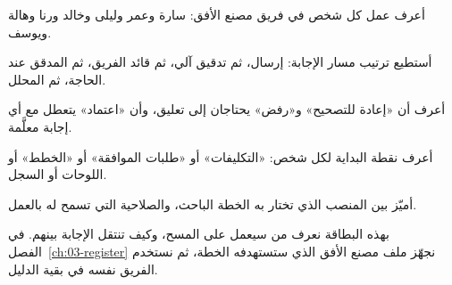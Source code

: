 \begin{rcchecklist}
\begin{checklist}
\item أعرف عمل كل شخص في فريق مصنع الأفق: سارة وعمر وليلى وخالد ورنا وهالة ويوسف.
\item أستطيع ترتيب مسار الإجابة: إرسال، ثم تدقيق آلي، ثم قائد الفريق، ثم المدقق عند الحاجة، ثم المحلل.
\item أعرف أن «إعادة للتصحيح» و«رفض» يحتاجان إلى تعليق، وأن «اعتماد» يتعطل مع أي إجابة معلَّمة.
\item أعرف نقطة البداية لكل شخص: «التكليفات» أو «طلبات الموافقة» أو «الخطط» أو اللوحات أو السجل.
\item أميّز بين المنصب الذي تختار به الخطة الباحث، والصلاحية التي تسمح له بالعمل.
\end{checklist}
\end{rcchecklist}

بهذه البطاقة نعرف من سيعمل على المسح، وكيف تنتقل الإجابة بينهم. في الفصل~\ref{ch:03-register} نجهّز ملف مصنع الأفق الذي ستستهدفه الخطة، ثم نستخدم الفريق نفسه في بقية الدليل.
